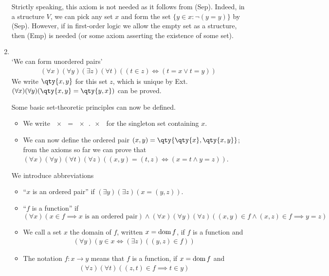 \begin{enumerate}
    Strictly speaking, this axiom is not needed as it follows from (Sep).
    Indeed, in a structure $V$, we can pick any set $x$ and form the set $\{y \in x : \neg (y = y)\}$ by (Sep).
    However, if in first-order logic we allow the empty set as a structure, then (Emp) is needed (or some axiom asserting the existence of some set).
    \item {} \\
    `We can form unordered pairs'
    \begin{align*}
        (\forall x)(\forall y)(\exists z)(\forall t)((t \in z) \Leftrightarrow (t = x \vee t = y))
    \end{align*}
    We write $\qty{x, y}$ for this set $z$, which is unique by Ext.
    $(\forall x)(\forall y) (\qty{x, y} = \qty{y, x})$ can be proved.

    Some basic set-theoretic principles can now be defined.
    \begin{itemize}
        \item We write $\qty{x} = \qty{x, x}$ for the singleton set containing $x$.
        \item We can now define the ordered pair $(x, y) = \qty{\qty{x}, \qty{x, y}}$; from the axioms so far we can prove that $(\forall x) (\forall y) (\forall t) (\forall z) ((x, y) = (t, z) \iff (x = t \wedge y = z))$.
    \end{itemize}

    We introduce abbreviations
    \begin{itemize}
        \item ``$x$ is an ordered pair'' if $(\exists y)(\exists z)(x = (y,z))$.
        \item ``$f$ is a function'' if $(\forall x)(x \in f \implies x \text{ is an ordered pair}) \wedge (\forall x)(\forall y)(\forall z)((x,y) \in f \wedge (x,z) \in f \implies y = z)$
        \item We call a set $x$ the domain of $f$, written $x = \operatorname{dom} f$, if $f$ is a function and
        \begin{align*}
            (\forall y)(y \in x \Leftrightarrow (\exists z)((y,z) \in f))
        \end{align*}
        \item The notation $f \colon x \to y$ means that $f$ is a function, if $x = \operatorname{dom} f$ and
        \begin{align*}
            (\forall z)(\forall t)((z, t) \in f \implies t \in y)
        \end{align*}
    \end{itemize}


\end{enumerate}
